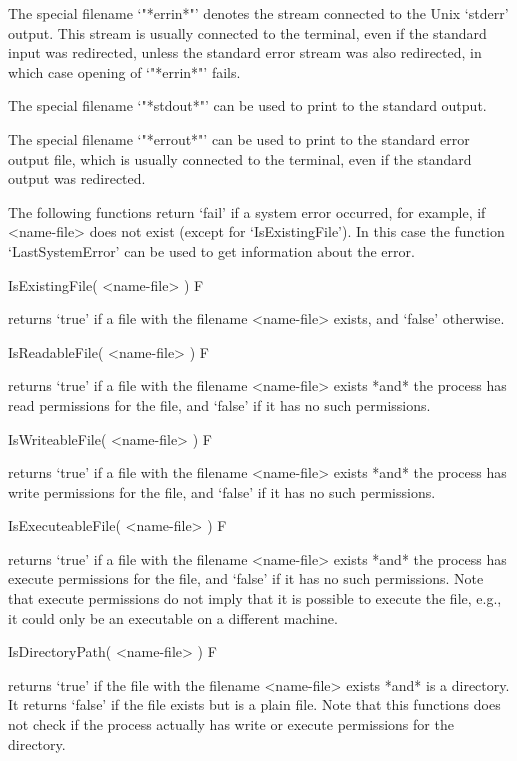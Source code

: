 The  special filename `"*errin*"' denotes   the stream connected  to  the
Unix `stderr' output.  This stream is usually connected  to the terminal, even
if  the standard input was  redirected, unless the  standard error stream
was also redirected, in which case opening of `"*errin*"' fails.
    
The special filename `"*stdout*"'  can be used to  print to  the standard
output.

The special  filename `"*errout*"' can be  used to  print to the standard
error output file, which is usually  connected  to  the terminal, even if
the standard output was redirected.
    

The  following functions  return `fail'  if a system  error occurred, for
example, if <name-file> does not exist (except for `IsExistingFile').  In
this case  the function `LastSystemError'  can be used to get information
about the error.

\>IsExistingFile( <name-file> ) F

returns `true'  if   a file  with the filename   <name-file>  exists, and
`false' otherwise.

\>IsReadableFile( <name-file> ) F

returns `true' if a  file with the  filename <name-file> exists *and* the
{\GAP} process has read  permissions for the  file, and `false' if it has
no such permissions.

\>IsWriteableFile( <name-file> ) F

returns `true'  if a file with the  filename <name-file> exists *and* the
{\GAP} process has write permissions for the  file, and `false' if it has
no such permissions.

\>IsExecuteableFile( <name-file> ) F

returns `true' if  a file with the  filename <name-file> exists *and* the
{\GAP} process has execute  permissions for the file,  and `false' if  it
has no such permissions.  Note that execute permissions do not imply that it
is possible to execute the file, e.g., it could only be an executable on a
different machine.

\>IsDirectoryPath( <name-file> ) F

returns `true' if the file with the  filename <name-file> exists *and* is
a directory.  It returns `false' if the file  exists but is a plain file.
Note  that this  functions does  not  check if   the  {\GAP} process
actually has write or execute permissions for the directory.

